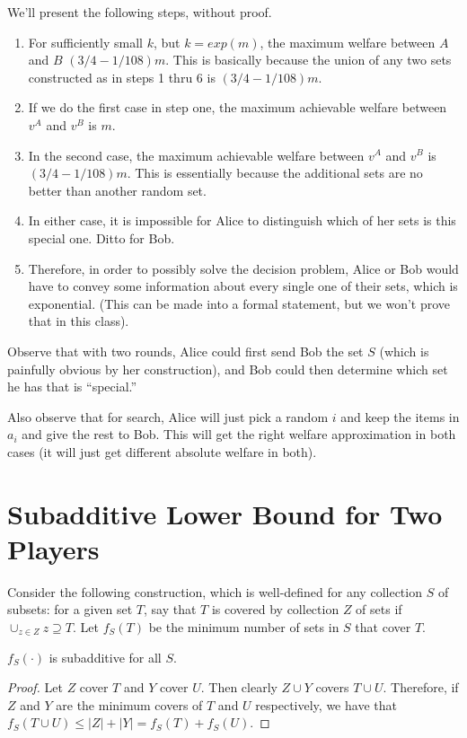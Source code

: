   We'll present the following steps, without proof.  \begin{enumerate} \item For
        sufficiently small $k$, but $k = exp(m)$, the maximum welfare between $A$
        and $B$ $(3/4-1/108)m$. This is basically because the union of any two
        sets constructed as in steps 1 thru 6 is $(3/4-1/108)m$.  \item If we do
        the first case in step one, the maximum achievable welfare between $v^A$
      and $v^B$ is $m$.  \item In the second case, the maximum achievable welfare
        between $v^A$ and $v^B$ is $(3/4-1/108)m$. This is essentially because the
        additional sets are no better than another random set.  \item In either
        case, it is impossible for Alice to distinguish which of her sets is this
      special one. Ditto for Bob.  \item Therefore, in order to possibly solve the
        decision problem, Alice or Bob would have to convey some information about
        every single one of their sets, which is exponential. (This can be made
        into a formal statement, but we won't prove that in this class).
    \end{enumerate}

  Observe that with two rounds, Alice could first send Bob the set $S$ (which is
  painfully obvious by her construction), and Bob could then determine which set
  he has that is ``special.''

  Also observe that for search, Alice will just pick a random $i$ and keep the
  items in $a_i$ and give the rest to Bob. This will get the right welfare
  approximation in both cases (it will just get different absolute welfare in
  both). 

\section{Subadditive Lower Bound for Two Players}
  Consider the following
  construction, which is well-defined for any collection $S$ of subsets: for a
  given set $T$, say that $T$ is covered by collection $Z$ of sets if $\cup_{z \in
  Z} z \supseteq T$. Let $f_S(T)$ be the minimum number of sets in $S$ that cover
  $T$. 

  \begin{lemma}$f_S(\cdot)$ is subadditive for all $S$.  \end{lemma} \begin{proof}
    Let $Z$ cover $T$ and $Y$ cover $U$. Then clearly $Z \cup Y$ covers $T \cup
    U$. Therefore, if $Z$ and $Y$ are the minimum covers of $T$ and $U$
    respectively, we have that $f_S(T \cup U) \leq |Z|+|Y| = f_S(T) + f_S(U)$.
  \end{proof}

